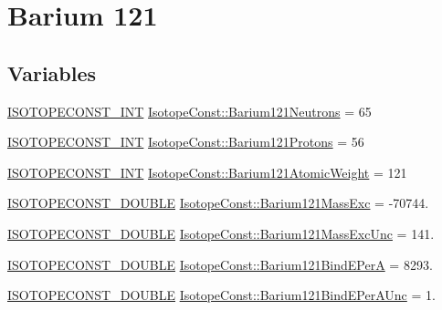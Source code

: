 \hypertarget{group___isotope_const-_barium-_ba121}{}\section{Barium 121}
\label{group___isotope_const-_barium-_ba121}
\subsection*{Variables}
\begin{DoxyCompactItemize}
\item 
\mbox{\hyperlink{group___isotope_const-_macros_ga5f18360b3e99483a35c32d789e62621c}{I\+S\+O\+T\+O\+P\+E\+C\+O\+N\+S\+T\+\_\+\+I\+NT}} \mbox{\hyperlink{group___isotope_const-_barium-_ba121_gab2d85b5eb3a1e91c9449450f02a077d5}{Isotope\+Const\+::\+Barium121\+Neutrons}} = 65
\item 
\mbox{\hyperlink{group___isotope_const-_macros_ga5f18360b3e99483a35c32d789e62621c}{I\+S\+O\+T\+O\+P\+E\+C\+O\+N\+S\+T\+\_\+\+I\+NT}} \mbox{\hyperlink{group___isotope_const-_barium-_ba121_ga20e09b12af283e73e44a5eff9782f95d}{Isotope\+Const\+::\+Barium121\+Protons}} = 56
\item 
\mbox{\hyperlink{group___isotope_const-_macros_ga5f18360b3e99483a35c32d789e62621c}{I\+S\+O\+T\+O\+P\+E\+C\+O\+N\+S\+T\+\_\+\+I\+NT}} \mbox{\hyperlink{group___isotope_const-_barium-_ba121_ga8d9847d91a0cab4f43895e2933414fe3}{Isotope\+Const\+::\+Barium121\+Atomic\+Weight}} = 121
\item 
\mbox{\hyperlink{group___isotope_const-_macros_ga8f45a7272ce02c0b4c65c44636ed719a}{I\+S\+O\+T\+O\+P\+E\+C\+O\+N\+S\+T\+\_\+\+D\+O\+U\+B\+LE}} \mbox{\hyperlink{group___isotope_const-_barium-_ba121_ga636e8bdc5e4314d59582fcb2cf8410e5}{Isotope\+Const\+::\+Barium121\+Mass\+Exc}} = -\/70744.
\item 
\mbox{\hyperlink{group___isotope_const-_macros_ga8f45a7272ce02c0b4c65c44636ed719a}{I\+S\+O\+T\+O\+P\+E\+C\+O\+N\+S\+T\+\_\+\+D\+O\+U\+B\+LE}} \mbox{\hyperlink{group___isotope_const-_barium-_ba121_ga66220b3156e2535b68a75b30b985ffbb}{Isotope\+Const\+::\+Barium121\+Mass\+Exc\+Unc}} = 141.
\item 
\mbox{\hyperlink{group___isotope_const-_macros_ga8f45a7272ce02c0b4c65c44636ed719a}{I\+S\+O\+T\+O\+P\+E\+C\+O\+N\+S\+T\+\_\+\+D\+O\+U\+B\+LE}} \mbox{\hyperlink{group___isotope_const-_barium-_ba121_gafda3d6317131d8c322f77f5024bd0339}{Isotope\+Const\+::\+Barium121\+Bind\+E\+PerA}} = 8293.
\item 
\mbox{\hyperlink{group___isotope_const-_macros_ga8f45a7272ce02c0b4c65c44636ed719a}{I\+S\+O\+T\+O\+P\+E\+C\+O\+N\+S\+T\+\_\+\+D\+O\+U\+B\+LE}} \mbox{\hyperlink{group___isotope_const-_barium-_ba121_ga3cff453e81d34aa2106bb8ea929ea8c2}{Isotope\+Const\+::\+Barium121\+Bind\+E\+Per\+A\+Unc}} = 1.

\end{DoxyCompactItemize}
